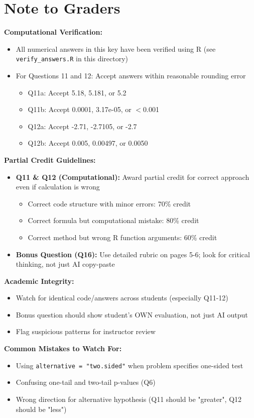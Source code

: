 \documentclass[11pt]{article}
\begin{document}
\section*{Note to Graders}

\textbf{Computational Verification:}
\begin{itemize}
\item All numerical answers in this key have been verified using R (see \texttt{verify\_answers.R} in this directory)
\item For Questions 11 and 12: Accept answers within reasonable rounding error
\begin{itemize}
\item Q11a: Accept 5.18, 5.181, or 5.2
\item Q11b: Accept 0.0001, 3.17e-05, or $<$0.001
\item Q12a: Accept -2.71, -2.7105, or -2.7
\item Q12b: Accept 0.005, 0.00497, or 0.0050
\end{itemize}
\end{itemize}

\textbf{Partial Credit Guidelines:}
\begin{itemize}
\item \textbf{Q11 \& Q12 (Computational):} Award partial credit for correct approach even if calculation is wrong
\begin{itemize}
\item Correct code structure with minor errors: 70\% credit
\item Correct formula but computational mistake: 80\% credit
\item Correct method but wrong R function arguments: 60\% credit
\end{itemize}
\item \textbf{Bonus Question (Q16):} Use detailed rubric on pages 5-6; look for critical thinking, not just AI copy-paste
\end{itemize}

\textbf{Academic Integrity:}
\begin{itemize}
\item Watch for identical code/answers across students (especially Q11-12)
\item Bonus question should show student's OWN evaluation, not just AI output
\item Flag suspicious patterns for instructor review
\end{itemize}

\textbf{Common Mistakes to Watch For:}
\begin{itemize}
\item Using \texttt{alternative = "two.sided"} when problem specifies one-sided test
\item Confusing one-tail and two-tail p-values (Q6)
\item Wrong direction for alternative hypothesis (Q11 should be "greater", Q12 should be "less")
\end{itemize}
\end{document}
